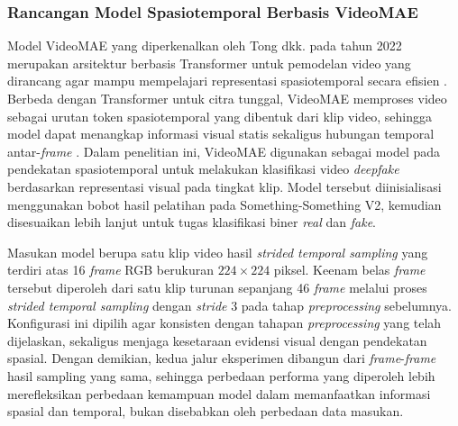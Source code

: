 \subsubsection{Rancangan Model Spasiotemporal Berbasis VideoMAE}
Model VideoMAE yang diperkenalkan oleh Tong dkk. pada tahun 2022 merupakan arsitektur berbasis Transformer untuk pemodelan video yang dirancang agar mampu mempelajari representasi spasiotemporal secara efisien \cite{tong2022videomaemaskedautoencodersdataefficient}. Berbeda dengan Transformer untuk citra tunggal, VideoMAE memproses video sebagai urutan token spasiotemporal yang dibentuk dari klip video, sehingga model dapat menangkap informasi visual statis sekaligus hubungan temporal antar-\textit{frame} \cite{tong2022videomaemaskedautoencodersdataefficient}. Dalam penelitian ini, VideoMAE digunakan sebagai model pada pendekatan spasiotemporal untuk melakukan klasifikasi video \textit{deepfake} berdasarkan representasi visual pada tingkat klip. Model tersebut diinisialisasi menggunakan bobot hasil pelatihan pada Something-Something V2, kemudian disesuaikan lebih lanjut untuk tugas klasifikasi biner \textit{real} dan \textit{fake}. \par

Masukan model berupa satu klip video hasil \textit{strided temporal sampling} yang terdiri atas 16 \textit{frame} RGB berukuran $224 \times 224$ piksel. Keenam belas \textit{frame} tersebut diperoleh dari satu klip turunan sepanjang 46 \textit{frame} melalui proses \textit{strided temporal sampling} dengan \textit{stride} 3 pada tahap \textit{preprocessing} sebelumnya. Konfigurasi ini dipilih agar konsisten dengan tahapan \textit{preprocessing} yang telah dijelaskan, sekaligus menjaga kesetaraan evidensi visual dengan pendekatan spasial. Dengan demikian, kedua jalur eksperimen dibangun dari \textit{frame}-\textit{frame} hasil sampling yang sama, sehingga perbedaan performa yang diperoleh lebih merefleksikan perbedaan kemampuan model dalam memanfaatkan informasi spasial dan temporal, bukan disebabkan oleh perbedaan data masukan. \par

